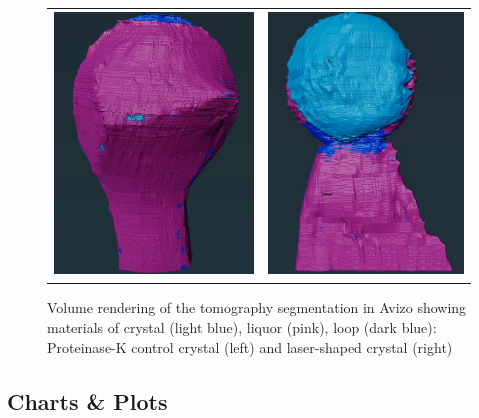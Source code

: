 \begin{figure}
    \begin{tabular}{cc}
	\includegraphics[height=7cm]{images/avizo_flats/prot_con.png} & \includegraphics[height=7cm]{images/avizo_flats/prot_ls.jpg}
    \end{tabular}
    \caption{Volume rendering of the tomography segmentation in Avizo showing materials of crystal (light blue), liquor (pink), loop (dark blue): Proteinase-K control crystal (left) and laser-shaped crystal (right)}
    \label{avizo_proteinasek}
\end{figure}
\newpage

\subsection*{Charts \& Plots}


